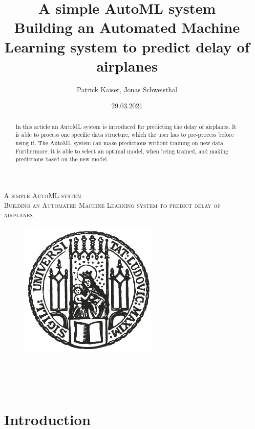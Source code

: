 \documentclass{article}
\title{\Huge A simple AutoML system \\
        \vspace{0.3cm} \large Building an Automated Machine Learning system to predict delay of airplanes}
\author{Patrick Kaiser, Jonas Schweisthal}
\date{29.03.2021}
\begin{document}
\begin{titlepage}
   \begin{center}
       \textsc{\Huge{ A simple AutoML system} \\
                \vspace{0.3cm} \large  Building an Automated Machine Learning system to predict delay of airplanes}
   \end{center}
   \begin{figure}[h]
       \centering
       \includegraphics[width = 7cm]{image/SiegelLMU.jpg}
   \end{figure}
   \begin{center}
       \\ 
        \\
       \vspace{0.7cm}
       \\
       \vspace{0.3cm}
   \end{center}
\end{titlepage}

\begin{abstract}
In this article an AutoML system is introduced for predicting the delay of airplanes. It is able to process one specific data structure, which the user has to pre-process before using it. The AutoML system can make predictions without training on new data. Furthermore, it is able to select an optimal model, when being trained, and making predictions based on the new model.
\end{abstract}

\tableofcontents

\newpage
\section{Introduction}
\end{document}
